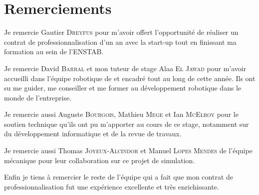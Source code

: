 \section*{Remerciements}

Je remercie Gautier \textsc{Dreyfus} pour m'avoir offert l'opportunité de réaliser un contrat de professionnalisation d'un an avec la start-up \forssea{} tout en finissant ma formation au sein de l'\gls{ENSTAB}.

Je remercie David \textsc{Barral} et mon tuteur de stage Alaa \textsc{El Jawad} pour m'avoir accueilli dans l'équipe robotique de \forssea{} et encadré tout au long de cette année. Ils ont su me guider, me conseiller et me former au développement robotique dans le monde de l'entreprise.

Je remercie aussi Auguste \textsc{Bourgois}, Mathieu \textsc{Mege} et Ian \textsc{McElroy} pour le soutien technique qu'ils ont pu m'apporter au cours de ce stage, notamment sur du développement informatique et de la revue de travaux.

Je remercie aussi Thomas \textsc{Joyeux-Alcindor} et Manuel \textsc{Lopes Mendes} de l'équipe mécanique pour leur collaboration sur ce projet de simulation.

Enfin je tiens à remercier le reste de l'équipe \forssea{} qui a fait que mon contrat de professionnalisation fut une expérience excellente et très enrichissante.